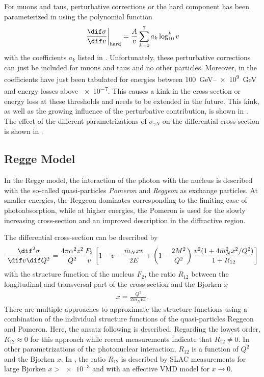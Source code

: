 For muons and taus, perturbative corrections or the hard component has been parameterized in \cite{Bugaev04HardComponent} using the polynomial function
\begin{align}
    \left. \frac{\dif \sigma}{\dif v} \right|_{\text{hard}} =
    \frac{A}{v} \sum\limits_{k=0}^7 a_k \log_{10}^k v
\end{align}
with the coefficients $a_k$ listed in .
Unfortunately, these perturbative corrections can just be included for muons and taus and no other particles.
Moreover, in \cite{Bugaev04HardComponent} the coefficients have just been tabulated for energies between \SIrange{100}{e9}{GeV} and energy losses above \num{e-7}.
This causes a kink in the cross-section or energy loss at these thresholds and needs to be extended in the future.
This kink, as well as the growing influence of the perturbative contribution, is shown in .
The effect of the different parametrizations of $\sigma_{\gamma N}$ on the differential cross-section is shown in .

\subsection{Regge Model}

In the Regge model, the interaction of the photon with the nucleus is described with the so-called quasi-particles \textit{Pomeron} and \textit{Reggeon} as exchange particles.
At smaller energies, the Reggeon dominates corresponding to the limiting case of photoabsorption, while at higher energies, the Pomeron is used for the slowly increasing cross-section and an improved description in the diffractive region.

The differential cross-section can be described by \cite{Abramowicz91}
\begin{align} \label{eq:photo_dsigma_regge}
    \frac{\dif^2 \sigma}{\dif v \dif Q^2} = \frac{4 \pi \alpha^2 z^2}{Q^2} \frac{F_2}{v}
    \left[
        1 - v - \frac{\bar{m}_N xv}{2E} +
        \left(1 - \frac{2M^2}{Q^2} \right) \frac{v^2 (1 + 4 \bar{m}_N^2 x^2 / Q^2)}{1 + R_{12}}
    \right]
\end{align}
with the structure function of the nucleus $F_2$, the ratio $R_{12}$ between the longitudinal and transversal part of the cross-section and the Bjorken $x$
\begin{align}
    x = \frac{Q^2}{2 \bar{m}_N E v} .
\end{align}
There are multiple approaches \cite{Abramowicz91, Butkevich02} to approximate the structure-functions using a combination of the individual structure functions of the quasi-particles Reggeon and Pomeron.
Here, the ansatz following \cite{Abramowicz91} is described.
Regarding the lowest order, $R_{12} \approx 0$ for this approach while recent measurements indicate that $R_{12} \neq 0$.
In other parametrizations of the photonuclear interaction, $R_{12}$ is a function of $Q^2$ and the Bjorken $x$.
In \cite{Butkevich02}, the ratio $R_{12}$ is described by SLAC measurements \cite{Abe99} for large Bjorken $x > \num{e-3}$ and with an effective VMD model \cite{Martin99} for $x \to 0$.

